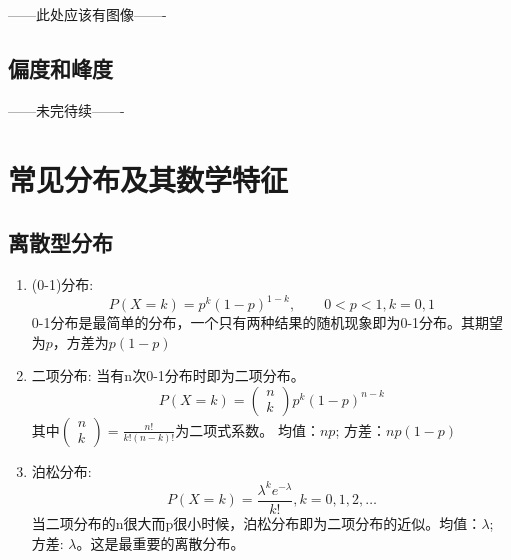 ------此处应该有图像-------
\subsection{偏度和峰度}
------未完待续-------
\section{常见分布及其数学特征}
\subsection{离散型分布}

\begin{enumerate}
\item (0-1)分布:
\begin{equation}
    P(X=k)=p^{k}(1-p)^{1-k},\qquad 0<p<1, k=0,1
\end{equation}
0-1分布是最简单的分布，一个只有两种结果的随机现象即为0-1分布。其期望为$p$，方差为$p(1-p)$

\item 二项分布: 当有n次0-1分布时即为二项分布。
\begin{equation}
    P(X=k)=\left(\begin{array}{l}n \\k\end{array}\right) p^{k}(1-p)^{n-k}
\end{equation}
其中$\left(\begin{matrix} n\\k \end{matrix}\right)=\frac{n!}{k!(n-k)!}$为二项式系数。
均值：$np$; 方差：$np(1-p)$

\item 泊松分布: 
\begin{equation}
    P(X=k)=\frac{\lambda^{k} e^{-\lambda}}{k !}, k=0,1,2, \ldots
\end{equation}
当二项分布的n很大而p很小时候，泊松分布即为二项分布的近似。均值：$\lambda$; 方差: $\lambda$。这是最重要的离散分布。
\end{enumerate}
